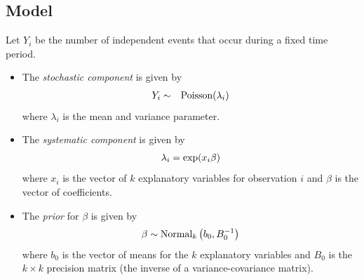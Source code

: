 \documentclass[letterpaper,10pt,english]{sphinxmanual}
\begin{document}
\subsection{Model}
\label{vignette:id104}
Let \(Y_{i}\) be the number of independent events that occur during
a fixed time period.
\begin{itemize}
\item {} 
The \emph{stochastic component} is given by
\begin{gather}
\begin{split}\begin{aligned}
Y_{i}  &  \sim & \textrm{Poisson}(\lambda_i)\end{aligned}\end{split}\notag
\end{gather}
where \(\lambda_i\) is the mean and variance parameter.

\item {} 
The \emph{systematic component} is given by
\begin{gather}
\begin{split}\begin{aligned}
\lambda_{i}= \exp(x_{i} \beta)\end{aligned}\end{split}\notag
\end{gather}
where \(x_{i}\) is the vector of \(k\) explanatory variables
for observation \(i\) and \(\beta\) is the vector of
coefficients.

\item {} 
The \emph{prior} for \(\beta\) is given by
\begin{gather}
\begin{split}\begin{aligned}
\beta \sim \textrm{Normal}_k \left(  b_{0},B_{0}^{-1}\right)\end{aligned}\end{split}\notag
\end{gather}
where \(b_{0}\) is the vector of means for the \(k\)
explanatory variables and \(B_{0}\) is the \(k \times k\)
precision matrix (the inverse of a variance-covariance matrix).

\end{itemize}
\end{document}
